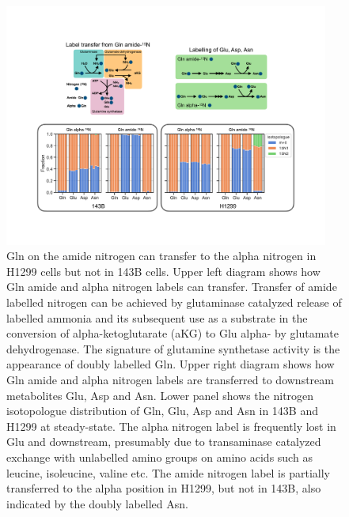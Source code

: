 \begin{figure}
    \centering
    \includegraphics[width=0.95\textwidth]{figures/chap2/app/gln_lab_tranfr.pdf}
    \caption[Gln amide to alpha \hNi{} transfer.]{
    Gln \hNi{} on the amide nitrogen can transfer to the alpha nitrogen in H1299 cells but not in 143B cells.
    Upper left diagram shows how Gln amide and alpha nitrogen labels can transfer.
    Transfer of amide labelled nitrogen can be achieved by glutaminase catalyzed release of labelled ammonia and its subsequent use as a substrate in the conversion of alpha-ketoglutarate (aKG) to Glu alpha-\hNi{} by glutamate dehydrogenase.
    The signature of glutamine synthetase activity is the appearance of doubly labelled Gln.
    Upper right diagram shows how Gln amide and alpha nitrogen labels are transferred to downstream metabolites Glu, Asp and Asn.
    Lower panel shows the nitrogen isotopologue distribution of Gln, Glu, Asp and Asn in 143B and H1299 at steady-state.
    The alpha nitrogen label is frequently lost in Glu and downstream, presumably due to transaminase catalyzed exchange with unlabelled amino groups on amino acids such as leucine, isoleucine, valine etc.
    The amide nitrogen label is partially transferred to the alpha position in H1299, but not in 143B, also indicated by the doubly labelled Asn.
    }
    \label{fig:app_ch2:gln_lab_tranfr}
\end{figure}

